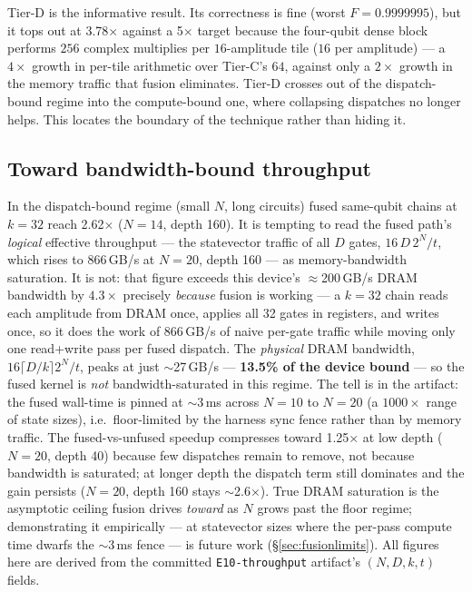 \documentclass[11pt]{article}
\begin{document}
Tier-D is the informative result. Its correctness is fine (worst
$F = 0.9999995$), but it tops out at 3.78$\times$ against a 5$\times$ target
because the four-qubit dense block performs $256$ complex multiplies per
$16$-amplitude tile ($16$ per amplitude) --- a $4\times$ growth in per-tile
arithmetic over Tier-C's $64$, against only a $2\times$ growth in the memory
traffic that fusion eliminates. Tier-D crosses out of the
dispatch-bound regime into the compute-bound one, where collapsing dispatches
no longer helps. This locates the boundary of the technique rather than hiding
it.

\subsection{Toward bandwidth-bound throughput}

In the dispatch-bound regime (small $N$, long circuits) fused same-qubit chains
at $k=32$ reach 2.62$\times$ ($N=14$, depth 160). It is tempting to read the
fused path's \emph{logical} effective throughput --- the statevector traffic of
all $D$ gates, $16\,D\,2^N/t$, which rises to 866\,GB/s at $N=20$, depth 160 ---
as memory-bandwidth saturation. It is not: that figure exceeds this device's
$\approx$200\,GB/s DRAM bandwidth by $4.3\times$ precisely \emph{because} fusion
is working --- a $k=32$ chain reads each amplitude from DRAM once, applies all
32 gates in registers, and writes once, so it does the work of 866\,GB/s of
naive per-gate traffic while moving only one read+write pass per fused dispatch.
The \emph{physical} DRAM bandwidth, $16\lceil D/k\rceil 2^N/t$, peaks at just
$\sim$27\,GB/s --- \textbf{13.5\% of the device bound} --- so the fused kernel is
\emph{not} bandwidth-saturated in this regime. The tell is in the artifact:
the fused wall-time is pinned at $\sim$3\,ms across $N=10$ to $N=20$ (a
$1000\times$ range of state sizes), i.e.\ floor-limited by the harness sync
fence rather than by memory traffic. The fused-vs-unfused speedup compresses
toward 1.25$\times$ at low depth ($N=20$, depth 40) because few dispatches remain
to remove, not because bandwidth is saturated; at longer depth the dispatch term
still dominates and the gain persists ($N=20$, depth 160 stays $\sim$2.6$\times$).
True DRAM saturation is the asymptotic ceiling fusion drives \emph{toward} as
$N$ grows past the floor regime; demonstrating it empirically --- at statevector
sizes where the per-pass compute time dwarfs the $\sim$3\,ms fence --- is future
work (\S\ref{sec:fusionlimits}). All figures here are derived from the committed
\texttt{E10-throughput} artifact's $(N,D,k,t)$ fields.
\end{document}

